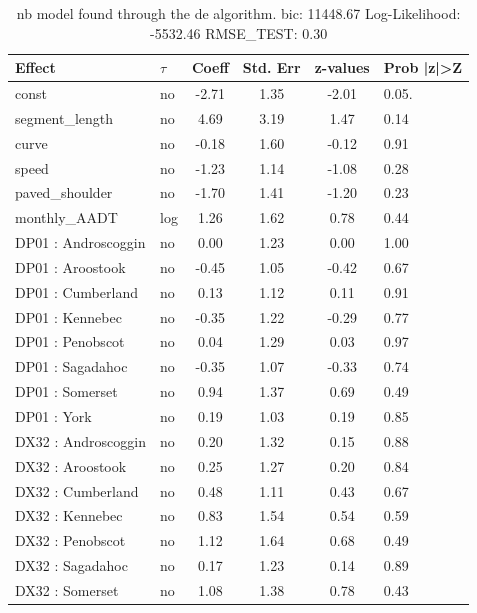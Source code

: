 \begin{table}
	\caption{nb model found through the de algorithm. bic: 11448.67 Log-Likelihood: -5532.46 RMSE_TEST: 0.30}
	\begin{center}
		\begin{tabular}{|l|l|c|c|c|l|}
			\hline
			Effect & $\tau$ & Coeff & Std. Err & z-values & Prob |z|>Z \\
			\hline
			const & no & -2.71 & 1.35 & -2.01 & 0.05. \\
			\hline
			segment_length & no & 4.69 & 3.19 & 1.47 & 0.14 \\
			\hline
			curve & no & -0.18 & 1.60 & -0.12 & 0.91 \\
			\hline
			speed & no & -1.23 & 1.14 & -1.08 & 0.28 \\
			\hline
			paved_shoulder & no & -1.70 & 1.41 & -1.20 & 0.23 \\
			\hline
			monthly_AADT & log & 1.26 & 1.62 & 0.78 & 0.44 \\
			\hline
			DP01 : Androscoggin & no & 0.00 & 1.23 & 0.00 & 1.00 \\
			\hline
			DP01 : Aroostook & no & -0.45 & 1.05 & -0.42 & 0.67 \\
			\hline
			DP01 : Cumberland & no & 0.13 & 1.12 & 0.11 & 0.91 \\
			\hline
			DP01 : Kennebec & no & -0.35 & 1.22 & -0.29 & 0.77 \\
			\hline
			DP01 : Penobscot & no & 0.04 & 1.29 & 0.03 & 0.97 \\
			\hline
			DP01 : Sagadahoc & no & -0.35 & 1.07 & -0.33 & 0.74 \\
			\hline
			DP01 : Somerset & no & 0.94 & 1.37 & 0.69 & 0.49 \\
			\hline
			DP01 : York & no & 0.19 & 1.03 & 0.19 & 0.85 \\
			\hline
			DX32 : Androscoggin & no & 0.20 & 1.32 & 0.15 & 0.88 \\
			\hline
			DX32 : Aroostook & no & 0.25 & 1.27 & 0.20 & 0.84 \\
			\hline
			DX32 : Cumberland & no & 0.48 & 1.11 & 0.43 & 0.67 \\
			\hline
			DX32 : Kennebec & no & 0.83 & 1.54 & 0.54 & 0.59 \\
			\hline
			DX32 : Penobscot & no & 1.12 & 1.64 & 0.68 & 0.49 \\
			\hline
			DX32 : Sagadahoc & no & 0.17 & 1.23 & 0.14 & 0.89 \\
			\hline
			DX32 : Somerset & no & 1.08 & 1.38 & 0.78 & 0.43 \\

\end{tabular}
\end{center}
\end{table}
